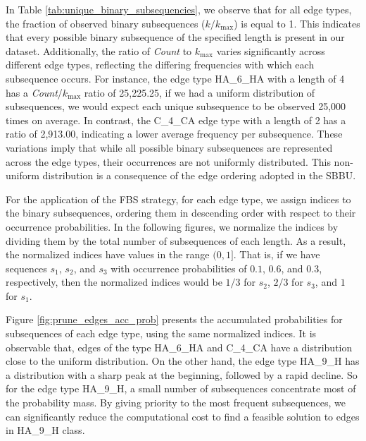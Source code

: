 \documentclass[journal=jacsat,manuscript=article]{achemso}
\begin{document}
In Table \ref{tab:unique_binary_subsequencies}, we observe that for all edge types, the fraction of observed binary subsequences ($k/k_{\text{max}}$) is equal to 1. This indicates that every possible binary subsequence of the specified length is present in our dataset. Additionally, the ratio of \emph{Count} to $k_{\text{max}}$ varies significantly across different edge types, reflecting the differing frequencies with which each subsequence occurs. For instance, the edge type HA\_6\_HA with a length of 4 has a \emph{Count}/$k_{\text{max}}$ ratio of 25,225.25, if we had a uniform distribution of subsequences, we would expect each unique subsequence to be observed 25,000 times on average. In contrast, the C\_4\_CA edge type with a length of 2 has a ratio of 2,913.00, indicating a lower average frequency per subsequence. These variations imply that while all possible binary subsequences are represented across the edge types, their occurrences are not uniformly distributed. This non-uniform distribution is a consequence of the edge ordering adopted in the SBBU.

For the application of the FBS strategy, for each edge type, we assign indices to the binary subsequences, ordering them in descending order with respect to their occurrence probabilities. In the following figures, we normalize the indices by dividing them by the total number of subsequences of each {length}. As a result, the normalized indices have values in the range $(0,1]$. That is, if we have sequences $s_1$, $s_2$, and $s_3$ with occurrence probabilities of $0.1$, $0.6$, and $0.3$, respectively, then the normalized indices would be $1/3$ for $s_2$, $2/3$ for $s_3$, and $1$ for $s_1$.

Figure \ref{fig:prune_edges_acc_prob} presents the accumulated probabilities for subsequences of each edge type, using the same normalized indices. It is observable that, edges of the type HA\_6\_HA and C\_4\_CA have a distribution close to the uniform distribution. On the other hand, the edge type HA\_9\_H has a distribution with a sharp peak at the beginning, followed by a rapid decline. So for the edge type HA\_9\_H, a small number of subsequences concentrate most of the probability mass. By giving priority to the most frequent subsequences, we can significantly reduce the computational cost to find a feasible solution to edges in HA\_9\_H class.
\end{document}
